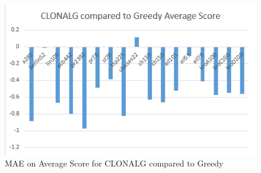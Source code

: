 \begin{figure}[H]
	\includegraphics[]{Images/CLONALG_Fig_Avg.png}
	\caption{MAE on Average Score for CLONALG compared to Greedy}
	\label{CLONALG_Avg}
\end{figure}
